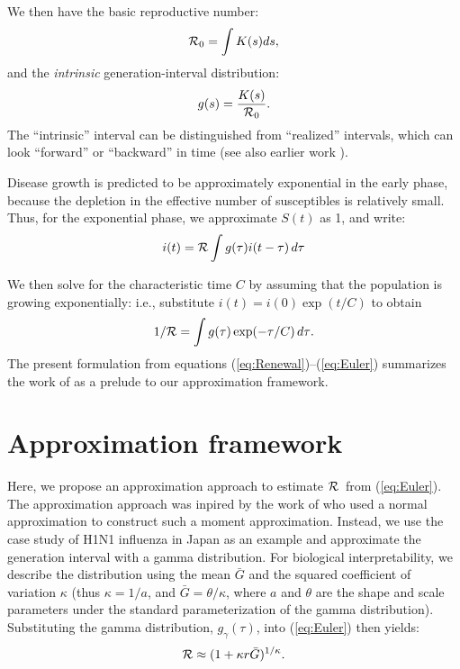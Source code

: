 \documentclass[12pt,]{article}
\newcommand{\RR}{\ensuremath{{\cal R}}}
\newcommand{\Rx}[1]{\ensuremath{{\cal R}_{#1}}}
\newcommand{\Ro}{\Rx{0}}
\newcommand{\Tc}{\ensuremath{C}}
\newcommand{\eref}[1]{(\ref{eq:#1})}
\begin{document}
We then have the basic reproductive number: 
\begin{equation}
\Ro = \int{K(s)ds},
\end{equation}
and the \emph{intrinsic} generation-interval distribution:
\begin{equation}
g(s) = \frac{K(s)}{\Ro}.
\end{equation}
The ``intrinsic'' interval can be distinguished from ``realized'' intervals, which can look ``forward'' or ``backward'' in time \cite{ChamDush15} (see also earlier work \cite{Sven07,Nish10}).

Disease growth is predicted to be approximately exponential in the early phase, because the depletion in the effective number of susceptibles is relatively small.
Thus, for the exponential phase, we approximate $S(t)$ as 1, and write:
\begin{equation}
i(t) = \RR\int{g(\tau)i(t-\tau) \,d\tau}
\end{equation}

We then solve for the characteristic time $\Tc$ by assuming that the population is growing exponentially: i.e., substitute $i(t) = i(0) \exp(t/\Tc)$ to obtain
\begin{equation}
	1/\RR = \int{g(\tau)\exp(-\tau/\Tc) \,d\tau}.\label{eq:Euler}
\end{equation}
The present formulation from equations \eref{Renewal}--\eref{Euler} summarizes the work of \cite{WallLips07} as a prelude to our approximation framework.

\section{Approximation framework}

Here, we propose an approximation approach to estimate \RR\ from \eref{Euler}. 
The approximation approach was inpired by the work of \cite{WallLips07} who used a normal approximation to construct such a moment approximation. 
Instead, we use the case study of H1N1 influenza in Japan \cite{NishCast09} as an example and approximate the generation interval with a gamma distribution.
For biological interpretability, we describe the distribution using the mean $\bar G$ and the squared coefficient of variation $\kappa$ (thus $\kappa = 1/a$, and $\bar G = \theta/\kappa$, where $a$ and $\theta$ are the shape and scale parameters under the standard parameterization of the gamma distribution).
Substituting the gamma distribution, $g_{\gamma}(\tau)$, into \eref{Euler} then yields:
\begin{equation}
	\RR \approx (1 + \kappa r \bar G)^{1/\kappa}.
	\label{eq:genExp}
\end{equation}
\end{document}
